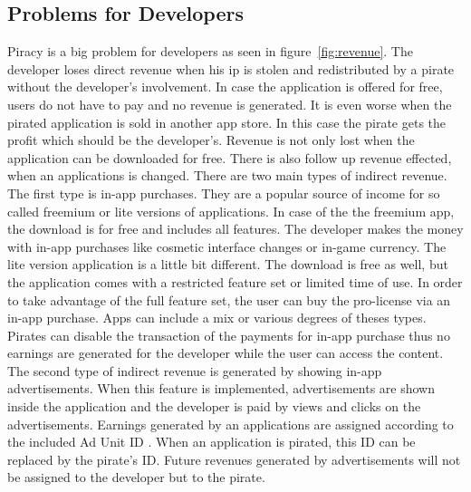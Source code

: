 \subsection{Problems for Developers} \label{subsection:foundation-piracy-developers}
Piracy is a big problem for developers as seen in figure~\ref{fig:revenue}.
The developer loses direct revenue when his \gls{ip} is stolen and redistributed by a pirate without the developer's involvement.
In case the application is offered for free, users do not have to pay and no revenue is generated.
It is even worse when the pirated application is sold in another app store.
In this case the pirate gets the profit which should be the developer's.
\newline
Revenue is not only lost when the application can be downloaded for free.
There is also follow up revenue effected, when an applications is changed.
There are two main types of indirect revenue.
\newline
The first type is in-app purchases.
They are a popular source of income for so called freemium or lite versions of applications.
In case of the the freemium app, the download is for free and includes all features.
The developer makes the money with in-app purchases like cosmetic interface changes or in-game currency.
The lite version application is a little bit different.
The download is free as well, but the application comes with a restricted feature set or limited time of use.
In order to take advantage of the full feature set, the user can buy the pro-license via an in-app purchase.
\newline
Apps can include a mix or various degrees of theses types.
Pirates can disable the transaction of the payments for in-app purchase thus no earnings are generated for the developer while the user can access the content.
\newline
The second type of indirect revenue is generated by showing in-app advertisements.
When this feature is implemented, advertisements are shown inside the application and the developer is paid by views and clicks on the advertisements.
Earnings generated by an applications are assigned according to the included Ad Unit ID \cite{googleAdmob}.
When an application is pirated, this ID can be replaced by the pirate's ID. Future revenues generated by advertisements will not be assigned to the developer but to the pirate.
\newline

